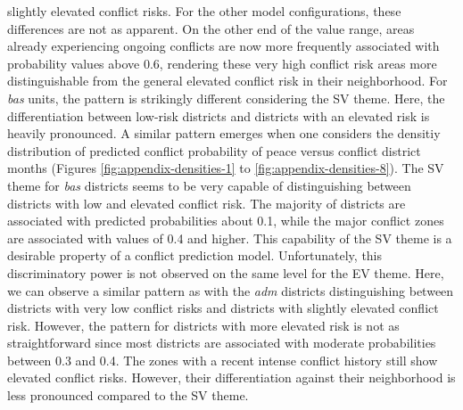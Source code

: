 \documentclass[a4paper,11pt]{article}
\begin{document}
slightly elevated conflict risks. For the other model configurations, these differences
are not as apparent. On the other end of the value range, areas already experiencing
ongoing conflicts are now more frequently associated with probability values
above 0.6, rendering these very high conflict risk areas more distinguishable
from the general elevated conflict risk in their neighborhood.
For \emph{bas} units, the pattern is strikingly different considering the SV theme.
Here, the differentiation between low-risk districts and districts with an elevated
risk is heavily pronounced. A similar pattern emerges when one considers the
densitiy distribution of predicted conflict probability of peace versus conflict
district months (Figures \ref{fig:appendix-densities-1} to \ref{fig:appendix-densities-8}).
The SV theme for \emph{bas} districts seems to be very capable of distinguishing between
districts with low and elevated conflict risk. The majority of districts are
associated with predicted probabilities about 0.1, while the major conflict zones
are associated with values of 0.4 and higher. This capability of the SV theme
is a desirable property of a conflict prediction model. Unfortunately,
this discriminatory power is not observed on the same level for the EV theme. Here,
we can observe a similar pattern as with the \emph{adm} districts distinguishing
between districts with very low conflict risks and districts with slightly elevated
conflict risk. However, the pattern for districts with more elevated risk is not
as straightforward since most districts are associated with moderate probabilities
between 0.3 and 0.4. The zones with a recent intense conflict history still show
elevated conflict risks. However, their differentiation against their neighborhood
is less pronounced compared to the SV theme.
\end{document}
